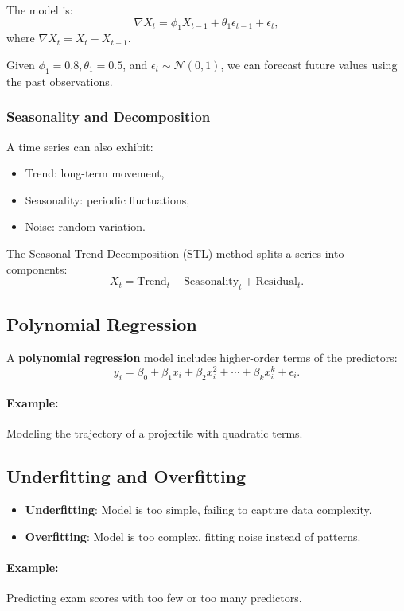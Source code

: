 \documentclass[12pt,a4paper]{article}
\begin{document}
The model is:
\[
\nabla X_t = \phi_1 X_{t-1} + \theta_1 \epsilon_{t-1} + \epsilon_t,
\]
where \( \nabla X_t = X_t - X_{t-1} \).

Given \( \phi_1 = 0.8, \theta_1 = 0.5 \), and \( \epsilon_t \sim \mathcal{N}(0, 1) \), we can forecast future values using the past observations.

\subsubsection{Seasonality and Decomposition}
A time series can also exhibit:
\begin{itemize}
    \item Trend: long-term movement,
    \item Seasonality: periodic fluctuations,
    \item Noise: random variation.
\end{itemize}

The Seasonal-Trend Decomposition (STL) method splits a series into components:
\[
X_t = \text{Trend}_t + \text{Seasonality}_t + \text{Residual}_t.
\]


\subsection{Polynomial Regression}
A \textbf{polynomial regression} model includes higher-order terms of the predictors:
\[
y_i = \beta_0 + \beta_1x_i + \beta_2x_i^2 + \cdots + \beta_kx_i^k + \epsilon_i.
\]

\paragraph{Example:}
Modeling the trajectory of a projectile with quadratic terms.

\subsection{Underfitting and Overfitting}
\begin{itemize}
    \item \textbf{Underfitting}: Model is too simple, failing to capture data complexity.
    \item \textbf{Overfitting}: Model is too complex, fitting noise instead of patterns.
\end{itemize}

\paragraph{Example:}
Predicting exam scores with too few or too many predictors.
\end{document}
